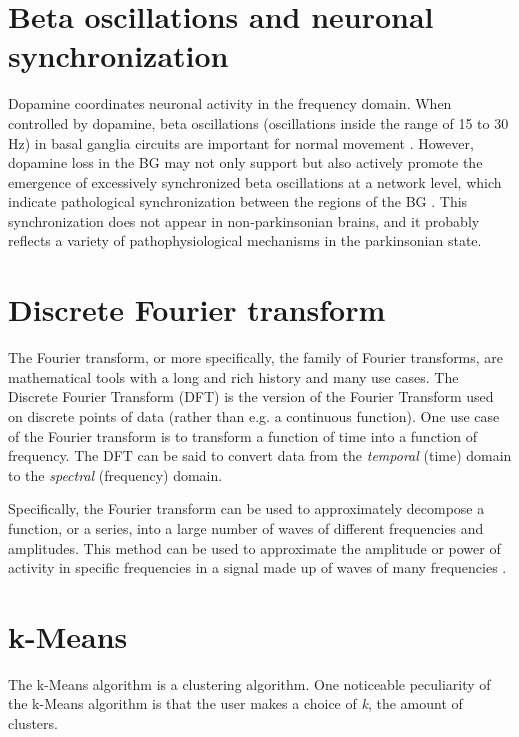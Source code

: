 \documentclass{kththesis}
\begin{document}
\section{Beta oscillations and neuronal synchronization}\label{BG BetaOsc NeurSyn}

Dopamine coordinates neuronal activity in the frequency domain. 
When controlled by dopamine, beta oscillations (oscillations inside the range of 15 to 30 Hz) in basal ganglia circuits are important for normal movement \parencite{Cagnan}. 
However, dopamine loss in the BG may not only support but also actively promote the emergence of excessively synchronized beta oscillations at a network level, which indicate pathological synchronization between the regions of the BG \parencite{Hammond}. 
This synchronization does not appear in non-parkinsonian brains, and it probably reflects a variety of pathophysiological mechanisms in the parkinsonian state.

\section{Discrete Fourier transform}\label{DFT BG}

The Fourier transform, or more specifically, the family of Fourier transforms, are mathematical tools with a long and rich history and many use cases. 
The Discrete Fourier Transform (DFT) is the version of the Fourier Transform used on discrete points of data (rather than e.g. a continuous function). 
One use case of the Fourier transform is to transform a function of time into a function of frequency. 
The DFT can be said to convert data from the \textit{temporal} (time) domain to the \textit{spectral} (frequency) domain.

Specifically, the Fourier transform can be used to approximately decompose a function, or a series, into a large number of waves of different frequencies and amplitudes. 
This method can be used to approximate the amplitude or power of activity in specific frequencies in a signal made up of waves of many frequencies \parencite{Fourier}.

\section{k-Means}\label{KM BG}

The k-Means algorithm is a clustering algorithm. 
One noticeable peculiarity of the k-Means algorithm is that the user makes a choice of \textit{k}, the amount of clusters. 
\end{document}
